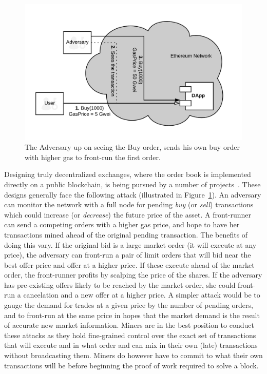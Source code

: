 \begin{figure}[t]
\centering
\includegraphics[width=0.7\linewidth]{figures/Regular_frontrunning.png}
\caption{\scriptsize The Adversary up on seeing the Buy order, sends his own buy order with higher gas to front-run the first order. \label{fig:RegularFrontrunning}} 
\end{figure}


Designing truly decentralized exchanges, where the order book is implemented directly on a public blockchain, is being pursued by a number of projects~\cite{inDEXgithub}. These designs generally face the following attack (illustrated in Figure~\ref{fig:RegularFrontrunning}). An adversary can monitor the network with a full node for pending \textit{buy} (or \textit{sell}) transactions which could increase (or \textit{decrease}) the future price of the asset. A front-runner can send a competing orders with a higher gas price, and hope to have her transactions mined ahead of the original pending transaction. The benefits of doing this vary. If the original bid is a large market order (\ie it will execute at any price), the adversary can front-run a pair of limit orders that will bid near the best offer price and offer at a higher price. If these execute ahead of the market order, the front-runner profits by scalping the price of the shares. If the adversary has pre-existing offers likely to be reached by the market order, she could front-run a cancelation and a new offer at a higher price. A simpler attack would be to gauge the demand for trades at a given price by the number of pending orders, and to front-run at the same price in hopes that the market demand is the result of accurate new market information. Miners are in the best position to conduct these attacks as they hold fine-grained control over the exact set of transactions that will execute and in what order and can mix in their own (late) transactions without broadcasting them. Miners do however have to commit to what their own transactions will be before beginning the proof of work required to solve a block. 

